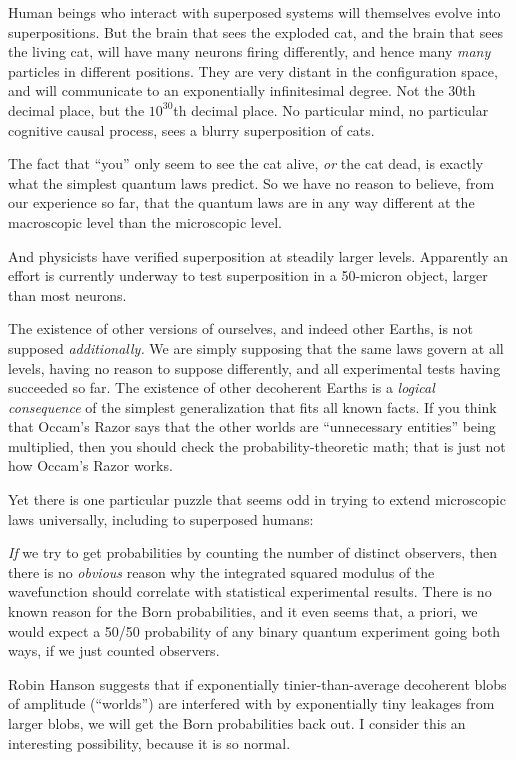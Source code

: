 {
 Human beings who interact with superposed systems will themselves
evolve into superpositions. But the brain that sees the exploded cat,
and the brain that sees the living cat, will have many neurons firing
differently, and hence many \textit{many} particles in different
positions. They are very distant in the configuration space, and will
communicate to an exponentially infinitesimal degree. Not the 30th
decimal place, but the $10^{30}$th decimal place. No
particular mind, no particular cognitive causal process, sees a blurry
superposition of cats.}

{
 The fact that ``you'' only seem
to see the cat alive, \textit{or} the cat dead, is exactly what the
simplest quantum laws predict. So we have no reason to believe, from
our experience so far, that the quantum laws are in any way different
at the macroscopic level than the microscopic level.}

{
 And physicists have verified superposition at steadily larger
levels. Apparently an effort is currently underway to test
superposition in a 50-micron object, larger than most neurons.}

{
 The existence of other versions of ourselves, and indeed other
Earths, is not supposed \textit{additionally.} We are simply supposing
that the same laws govern at all levels, having no reason to suppose
differently, and all experimental tests having succeeded so far. The
existence of other decoherent Earths is a \textit{logical consequence}
of the simplest generalization that fits all known facts. If you think
that Occam's Razor says that the other worlds are
``unnecessary entities'' being
multiplied, then you should check the probability-theoretic math; that
is just not how Occam's Razor works.}

{
 Yet there is one particular puzzle that seems odd in trying to
extend microscopic laws universally, including to superposed humans:}

{
 \textit{If} we try to get probabilities by counting the number of
distinct observers, then there is no \textit{obvious} reason why the
integrated squared modulus of the wavefunction should correlate with
statistical experimental results. There is no known reason for the Born
probabilities, and it even seems that, a priori, we would expect a
50/50 probability of any binary quantum experiment going both ways, if
we just counted observers.}

{
 Robin Hanson suggests that if exponentially tinier-than-average
decoherent blobs of amplitude
(``worlds'') are interfered with by
exponentially tiny leakages from larger blobs, we will get the Born
probabilities back out. I consider this an interesting possibility,
because it is so normal.}

